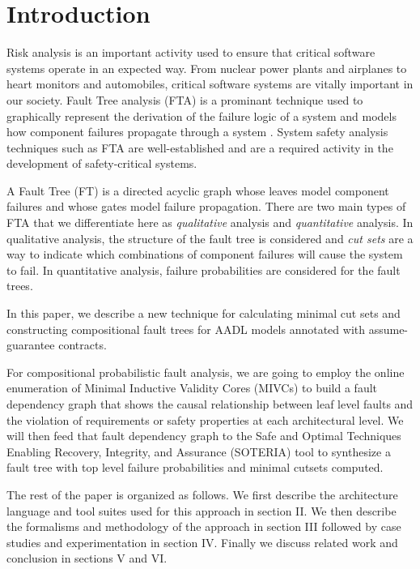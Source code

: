 \section{Introduction}
\label{sec:intro}

Risk analysis is an important activity used to ensure that critical software systems operate in an expected way. From nuclear power plants and airplanes to heart monitors and automobiles, critical software systems are vitally important in our society. Fault Tree analysis (FTA) is a prominant technique used to graphically represent the derivation of the failure logic of a system and models how component failures propagate through a system \cite{0f356f05e72f43018211b36f97c8854a}. System safety analysis techniques such as FTA are well-established and are a required activity in the development of safety-critical systems. 

A Fault Tree (FT) is a directed acyclic graph whose leaves model component failures and whose gates model failure propagation.  There are two main types of FTA that we differentiate here as \textit{qualitative} analysis and \textit{quantitative} analysis. In qualitative analysis, the structure of the fault tree is considered and \textit{cut sets} are a way to indicate which combinations of component failures will cause the system to fail. In quantitative analysis, failure probabilities are considered for the fault trees.  

In this paper, we describe a new technique for calculating minimal cut sets and constructing compositional fault trees for AADL models annotated with assume-guarantee contracts. 

For compositional probabilistic fault analysis, we are going to employ the online enumeration of Minimal Inductive Validity Cores (MIVCs) \cite{GhassabaniGW16,Ghassabani2017EfficientGO} to build a fault dependency graph that shows the causal relationship between leaf level faults and the violation of requirements or safety properties at each architectural level.  We will then feed that fault dependency graph to the Safe and Optimal Techniques Enabling Recovery, Integrity, and Assurance (SOTERIA) tool \cite{SOTERIAproject} to synthesize a fault tree with top level failure probabilities and minimal cutsets computed.

The rest of the paper is organized as follows. We first describe the architecture language and tool suites used for this approach in section II. We then describe the formalisms and methodology of the approach in section III followed by case studies and experimentation in section IV. Finally we discuss related work and conclusion in sections V and VI.  
